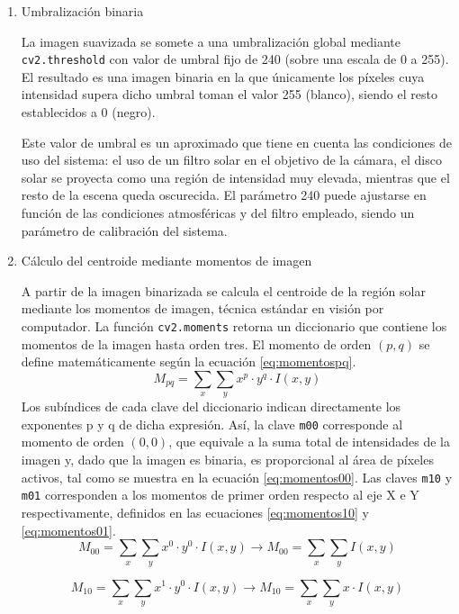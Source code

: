 \begin{enumerate}
    \item{Umbralización binaria}
    
    La imagen suavizada se somete a una umbralización global mediante \texttt{cv2.threshold} con valor de umbral fijo de 240 (sobre una escala de 0 a 255). El resultado es una imagen binaria en la que únicamente los píxeles cuya intensidad supera dicho umbral toman el valor 255 (blanco), siendo el resto establecidos a 0 (negro).
    
    Este valor de umbral es un aproximado que tiene en cuenta las condiciones de uso del sistema: el uso de un filtro solar en el objetivo de la cámara, el disco solar se proyecta como una región de intensidad muy elevada, mientras que el resto de la escena queda oscurecida. El parámetro 240 puede ajustarse en función de las condiciones atmosféricas y del filtro empleado, siendo un parámetro de calibración del sistema.
    
    \item{Cálculo del centroide mediante momentos de imagen}
    
	A partir de la imagen binarizada se calcula el centroide de la región solar mediante los momentos de imagen, técnica estándar en visión por computador. La función \texttt{cv2.moments} retorna un diccionario que contiene los momentos de la imagen hasta orden tres. El momento de orden $(p,q)$ se define matemáticamente según la ecuación \eqref{eq:momentospq}.
	\begin{equation}
		M_{pq}=\sum_x \sum_y x^p\cdot y^q\cdot I(x,y)
	\label{eq:momentospq}
	\end{equation}	
Los subíndices de cada clave del diccionario indican directamente los exponentes p y q de dicha expresión. Así, la clave \texttt{m00} corresponde al momento de orden $(0,0)$, que equivale a la suma total de intensidades de la imagen y, dado que la imagen es binaria, es proporcional al área de píxeles activos, tal como se muestra en la ecuación \eqref{eq:momentos00}. Las claves \texttt{m10} y \texttt{m01} corresponden a los momentos de primer orden respecto al eje X e Y respectivamente, definidos en las ecuaciones \eqref{eq:momentos10} y \eqref{eq:momentos01}.
	\begin{equation}
		M_{00}=\sum_x \sum_y x^0\cdot y^0\cdot I(x,y)\to M_{00}=\sum_x \sum_y I(x,y)
	\label{eq:momentos00}
	\end{equation}
	
	\begin{equation}
		M_{10}=\sum_x \sum_y x^1\cdot y^0\cdot I(x,y)\to M_{10}=\sum_x \sum_y x\cdot I(x,y)
	\label{eq:momentos10}
	\end{equation}
	

\end{enumerate}
